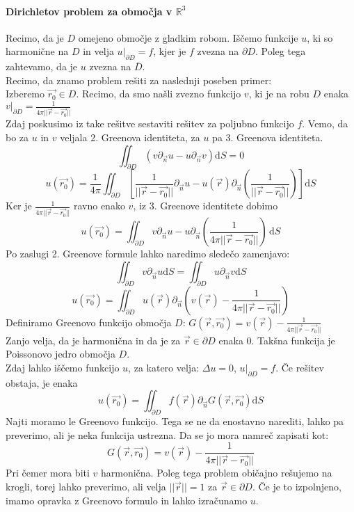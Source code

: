 \documentclass[a4paper]{article}
\newcommand{\vct}[1]{\overrightarrow{#1}}
\newcommand{\dif}{\mathrm{d}}
\newcommand{\R}{\mathbb{R}}
\begin{document}
\paragraph{Dirichletov problem za območja v $\R^3$} Recimo, da je $D$ omejeno območje z gladkim robom. Iščemo funkcije $u$, ki so harmonične na $D$ in velja $\displaystyle{u\big|_{\partial D} = f}$, kjer je $f$ zvezna
na $\partial D$. Poleg tega zahtevamo, da je $u$ zvezna na $\overline{D}$. \\[3mm]
Recimo, da znamo problem rešiti za naslednji poseben primer: \\
Izberemo $\vct{r_0} \in D$. Recimo, da smo našli zvezno funkcijo $v$, ki je na robu $D$ enaka $\displaystyle{v\big|_{\partial D} = \frac{1}{4\pi ||\vct{r} - \vct{r_0}||}}$ \\[3mm]
Zdaj poskusimo iz take rešitve sestaviti rešitev za poljubno funkcijo $f$. Vemo, da bo za $u$ in $v$ veljala 2. Greenova identiteta, za $u$ pa 3. Greenova identiteta.
$$\iint_{\partial D}\left(v\partial_{\vct{n}}u - u\partial_{\vct{n}}v\right)\dif S = 0$$
$$u(\vct{r_0}) = \frac{1}{4\pi} \iint_{\partial D}\left[\frac{1}{||\vct{r} - \vct{r_0}||}\partial_{\vct{n}}u - u(\vct{r})\partial_{\vct{n}}\left(\frac{1}{||\vct{r} - \vct{r_0}||}\right)\right]\dif S$$
Ker je $\displaystyle{\frac{1}{4\pi||\vct{r} - \vct{r_0}||}}$ ravno enako $v$, iz 3. Greenove identitete dobimo
$$u(\vct{r_0}) = \iint_{\partial D} v\partial_{\vct{n}}u - u\partial_{\vct{n}}\left(\frac{1}{4\pi ||\vct{r} - \vct{r_0}||}\right) \,\dif S$$
Po zaslugi 2. Greenove formule lahko naredimo sledečo zamenjavo:
$$\iint_{\partial D} v\partial_{\vct{n}}u \dif S = \iint_{\partial D} u\partial_{\vct{n}}v \dif S$$
$$u(\vct{r_0}) = \iint_{\partial D} u(\vct{r})\partial_{\vct{n}}\left(v(\vct{r}) - \frac{1}{4\pi ||\vct{r} - \vct{r_0}||}\right)$$
Definiramo Greenovo funkcijo območja $D$: $\displaystyle{G(\vct{r}, \vct{r_0}) = v(\vct{r}) - \frac{1}{4\pi ||\vct{r} - \vct{r_0}||}}$ \\
Zanjo velja, da je harmonična in da je za $\vct{r} \in \partial D$ enaka 0. Takšna funkcija je Poissonovo jedro območja $D$. \\
Zdaj lahko iščemo funkcijo $u$, za katero velja: $\Delta u = 0$, $\displaystyle{u\big|_{\partial D} = f}$. Če rešitev obstaja, je enaka
$$u(\vct{r_0}) = \iint_{\partial D} f(\vct{r})\partial_{\vct{n}} G(\vct{r}, \vct{r_0}) \dif S$$
Najti moramo le Greenovo funkcijo. Tega se ne da enostavno narediti, lahko pa preverimo, ali je neka funkcija ustrezna. Da se jo mora namreč zapisati kot:
$$G(\vct{r}, \vct{r_0}) = v(\vct{r}) - \frac{1}{4\pi ||\vct{r} - \vct{r_0}||}$$
Pri čemer mora biti $v$ harmonična. Poleg tega problem običajno rešujemo na krogli, torej lahko preverimo, ali velja $||\vct{r}|| = 1$ za $\vct{r} \in \partial D$.
Če je to izpolnjeno, imamo opravka z Greenovo formulo in lahko izračunamo $u$.
\end{document}

